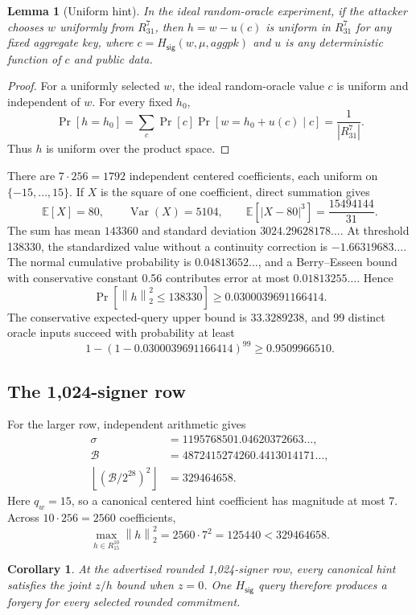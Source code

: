 \documentclass[10pt,a4paper]{article}
\newtheorem{lemma}{Lemma}
\newtheorem{corollary}{Corollary}
\newcommand{\norm}[1]{\left\lVert #1\right\rVert_2}
\newcommand{\Hsig}{H_{\mathsf{sig}}}
\begin{document}
\begin{lemma}[Uniform hint]
In the ideal random-oracle experiment, if the attacker chooses $w$ uniformly
from $R_{31}^{7}$, then $h=w-u(c)$ is uniform in $R_{31}^{7}$ for any fixed
aggregate key, where $c=\Hsig(w,\mu,\mathit{aggpk})$ and $u$ is any
deterministic function of $c$ and public data.
\end{lemma}

\begin{proof}
For a uniformly selected $w$, the ideal random-oracle value $c$ is uniform and
independent of $w$. For every fixed $h_0$,
\[
 \Pr[h=h_0]
 =\sum_c \Pr[c]\Pr[w=h_0+u(c)\mid c]
 =\frac{1}{|R_{31}^{7}|}.
\]
Thus $h$ is uniform over the product space.
\end{proof}

There are $7\cdot256=1792$ independent centered coefficients, each uniform on
$\{-15,\ldots,15\}$. If $X$ is the square of one coefficient, direct summation
gives
\[
  \mathbb E[X]=80,\qquad
  \mathop{\mathrm{Var}}(X)=5104,\qquad
  \mathbb E[|X-80|^3]=\frac{15494144}{31}.
\]
The sum has mean $143360$ and standard deviation
$3024.29628178\ldots$. At threshold 138330, the standardized value without a
continuity correction is $-1.66319683\ldots$. The normal cumulative
probability is $0.04813652\ldots$, and a Berry--Esseen bound with conservative
constant 0.56 contributes error at most $0.01813255\ldots$. Hence
\[
  \Pr[\norm{h}^2\leq138330]
  \geq 0.0300039691166414.
\]
The conservative expected-query upper bound is $33.3289238$, and 99 distinct
oracle inputs succeed with probability at least
\[
  1-(1-0.0300039691166414)^{99}
  \geq 0.9509966510.
\]

\subsection{The 1,024-signer row}

For the larger row, independent arithmetic gives
\begin{align*}
  \sigma &=1195768501.04620372663\ldots,\\
  \mathcal B&=4872415274260.4413014171\ldots,\\
  \left\lfloor(\mathcal B/2^{28})^2\right\rfloor&=329464658.
\end{align*}
Here $q_w=15$, so a canonical centered hint coefficient has magnitude at most
7. Across $10\cdot256=2560$ coefficients,
\[
  \max_{h\in R_{15}^{10}}\norm{h}^2
  =2560\cdot7^2
  =125440
  <329464658.
\]

\begin{corollary}
At the advertised rounded 1,024-signer row, every canonical hint satisfies the
joint $z/h$ bound when $z=0$. One $\Hsig$ query therefore produces a forgery
for every selected rounded commitment.
\end{corollary}
\end{document}
